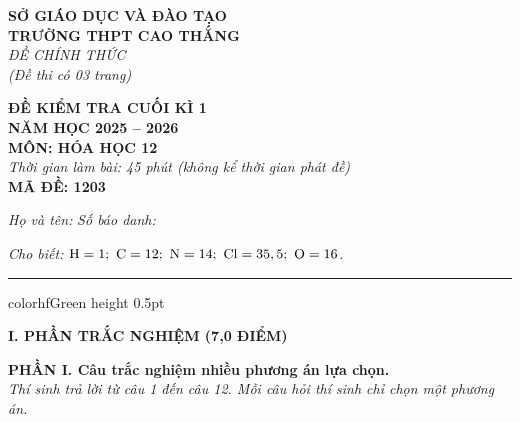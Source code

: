 \documentclass[11pt,a4paper]{article}
\begin{document}
\begin{minipage}[t]{0.48\textwidth}
\textbf{SỞ GIÁO DỤC VÀ ĐÀO TẠO}\\
\textbf{TRƯỜNG THPT CAO THẮNG}\\
\textit{ĐỀ CHÍNH THỨC}\\
\textit{(Đề thi có 03 trang)}
\end{minipage}
\hfill
\begin{minipage}[t]{0.48\textwidth}
\raggedleft
\textbf{\color{hfRed}ĐỀ KIỂM TRA CUỐI KÌ 1}\\
\textbf{NĂM HỌC 2025 -- 2026}\\
\textbf{MÔN: HÓA HỌC 12}\\
\textit{Thời gian làm bài: 45 phút (không kể thời gian phát đề)}\\
\textbf{MÃ ĐỀ: 1203}
\end{minipage}

\vspace{4pt}
\noindent
\textit{Họ và tên:} \dotfill \textit{Số báo danh:} \dotfill

\vspace{3pt}
\noindent
\textit{\footnotesize Cho biết: $\ce{H}=1;\ \ce{C}=12;\ \ce{N}=14;\ \ce{Cl}=35,5;\ \ce{O}=16$.}

\vspace{3pt}
\hrule color{hfGreen} height 0.5pt

\vspace{4pt}
\noindent
{\color{mainGreen}\textbf{\Large I. PHẦN TRẮC NGHIỆM (7,0 ĐIỂM)}}

\vspace{3pt}
\noindent
{\color{mainGreen}\textbf{\large PHẦN I. Câu trắc nghiệm nhiều phương án lựa chọn.}}\\
\textit{\small Thí sinh trả lời từ câu 1 đến câu 12. Mỗi câu hỏi thí sinh chỉ chọn một phương án.}
\vspace{2pt}
\end{document}
